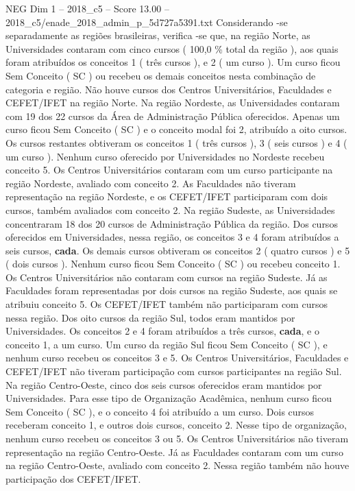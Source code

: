 \begin{textsample}{NEG Dim 1 – 2018\_c5 – Score 13.00 – 2018\_c5/enade\_2018\_admin\_p\_5d727a5391.txt}
Considerando -se separadamente as regiões brasileiras, verifica -se que, na região Norte, as Universidades contaram com cinco cursos ( 100,0 \% total da região ), aos quais foram atribuídos os conceitos 1 ( três cursos ), e 2 ( um curso ).
Um curso ficou Sem Conceito ( SC ) ou recebeu os demais conceitos nesta combinação de categoria e região.
Não houve cursos dos Centros Universitários, Faculdades e CEFET/IFET na região Norte.
Na região Nordeste, as Universidades contaram com 19 dos 22 cursos da Área de Administração Pública oferecidos.
Apenas um curso ficou Sem Conceito ( SC ) e o conceito modal foi 2, atribuído a oito cursos.
Os cursos restantes obtiveram os conceitos 1 ( três cursos ), 3 ( seis cursos ) e 4 ( um curso ).
Nenhum curso oferecido por Universidades no Nordeste recebeu conceito 5.
Os Centros Universitários contaram com um curso participante na região Nordeste, avaliado com conceito 2.
As Faculdades não tiveram representação na região Nordeste, e os CEFET/IFET participaram com dois cursos, também avaliados com conceito 2.
Na região Sudeste, as Universidades concentraram 18 dos 20 cursos de Administração Pública da região.
Dos cursos oferecidos em Universidades, nessa região, os conceitos 3 e 4 foram atribuídos a seis cursos, \textbf{cada}.
Os demais cursos obtiveram os conceitos 2 ( quatro cursos ) e 5 ( dois cursos ).
Nenhum curso ficou Sem Conceito ( SC ) ou recebeu conceito 1.
Os Centros Universitários não contaram com cursos na região Sudeste.
Já as Faculdades foram representadas por dois cursos na região Sudeste, aos quais se atribuiu conceito 5.
Os CEFET/IFET também não participaram com cursos nessa região.
Dos oito cursos da região Sul, todos eram mantidos por Universidades.
Os conceitos 2 e 4 foram atribuídos a três cursos, \textbf{cada}, e o conceito 1, a um curso.
Um curso da região Sul ficou Sem Conceito ( SC ), e nenhum curso recebeu os conceitos 3 e 5.
Os Centros Universitários, Faculdades e CEFET/IFET não tiveram participação com cursos participantes na região Sul.
Na região Centro-Oeste, cinco dos seis cursos oferecidos eram mantidos por Universidades.
Para esse tipo de Organização Acadêmica, nenhum curso ficou Sem Conceito ( SC ), e o conceito 4 foi atribuído a um curso.
Dois cursos receberam conceito 1, e outros dois cursos, conceito 2.
Nesse tipo de organização, nenhum curso recebeu os conceitos 3 ou 5.
Os Centros Universitários não tiveram representação na região Centro-Oeste.
Já as Faculdades contaram com um curso na região Centro-Oeste, avaliado com conceito 2.
Nessa região também não houve participação dos CEFET/IFET.

\end{textsample}
